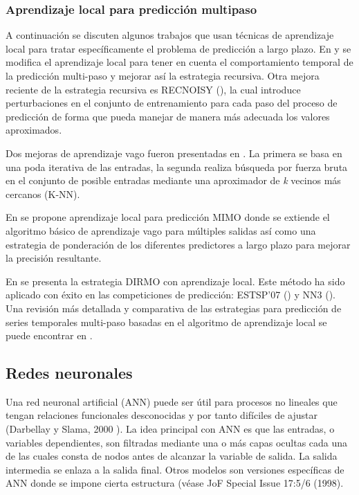 \documentclass{llncs}
\begin{document}
\subsubsection{Aprendizaje local para predicción multipaso\\}
A continuación se discuten algunos trabajos que usan técnicas de aprendizaje local para tratar específicamente el problema de predicción a largo plazo.  En \cite{McNames1998112} y \cite{Bontempi199932} se modifica el aprendizaje local para tener en cuenta el comportamiento temporal de la predicción multi-paso y mejorar así la estrategia recursiva. Otra mejora reciente de la estrategia recursiva es RECNOISY (\cite{BenTaieb2011}), la cual introduce perturbaciones en el conjunto de entrenamiento para cada paso del proceso de predicción de forma que pueda manejar de manera más adecuada los valores aproximados. 

Dos mejoras de aprendizaje vago fueron presentadas en \cite{Sorjamaa2005509}. La primera se basa en una poda iterativa de las entradas, la segunda realiza búsqueda por fuerza bruta en el conjunto de posible entradas mediante una aproximador de \emph{k} vecinos más cercanos (K-NN).

En \cite{Bontempi2008145} se propone aprendizaje local para predicción MIMO donde se extiende el algoritmo básico de aprendizaje vago para múltiples salidas así como una estrategia de ponderación de los diferentes predictores a largo plazo para mejorar la precisión resultante.

En  \cite{BenTaieb2009}  \cite{BenTaieb20101950} se presenta la estrategia DIRMO con aprendizaje local. Este método ha sido aplicado con éxito en las competiciones de predicción: ESTSP'07 (\cite{BenTaieb2009}) y NN3 (\cite{BenTaieb20101950}).
Una revisión más detallada y comparativa de las estrategias para predicción de series temporales multi-paso basadas en el algoritmo de aprendizaje local se puede encontrar en \cite{Roberts1982808}.


\subsection{Redes neuronales}

Una red neuronal artificial (ANN) puede ser útil para procesos no lineales que tengan relaciones funcionales desconocidas y por tanto difíciles de ajustar (Darbellay y Slama, 2000 \cite{Darbellay200071}). La idea principal con ANN es que las entradas, o variables dependientes, son filtradas mediante una o más capas ocultas cada una de las cuales consta de nodos antes de alcanzar la variable de salida. La salida intermedia se enlaza a la salida final. Otros modelos son versiones específicas de ANN donde se impone cierta estructura (véase JoF Special Issue 17:5/6 (1998).
\end{document}
